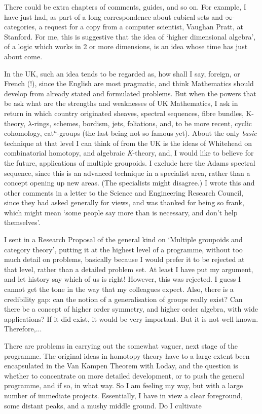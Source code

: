 \documentclass[11pt]{article}
\begin{document}
There could be extra chapters of comments, guides, and so on. For
example, I have just had, as part of a long correspondence about cubical
sets and $\infty$-categories, a request for a copy from a computer scientist,
Vaughan Pratt, at Stanford. For me, this is suggestive that the idea of
`higher dimensional algebra', of a logic which works in 2 or more
dimensions, is an idea whose time has just about come.

In the UK, such an idea tends to be regarded as, how shall I say,
foreign, or French (!), since the English are most pragmatic, and think
Mathematics should develop from already stated and formulated problems. But
when the powers that be ask what are the strengths and weaknesses of UK
Mathematics, I ask in return in which country originated sheaves, spectral
sequences, fibre bundles, K-theory, $\lambda$-rings, schemes, bordism, jets,
foliations, and, to be more recent, cyclic cohomology, cat$^{n}$-groups (the last
being not so famous yet). About the only \textit{basic} technique at that level I
can think of from the UK is the ideas of Whitehead on combinatorial
homotopy, and algebraic \textit{K}-theory, and, I would like to believe for the
future, applications of multiple groupoids. I exclude here the Adams
spectral sequence, since this is an advanced technique in a specialist area,
rather than a concept opening up new areas. (The specialists might
disagree.) I wrote this and other comments in a letter to the Science and
Engineering Research Council, since they had asked generally for views, and
was thanked for being so frank, which might mean `some people say more than
is necessary, and don't help themselves'.

I sent in a Research Proposal of the general kind on `Multiple
groupoids and category theory', putting it at the highest level of a
programme, without too much detail on problems, basically because I would
prefer it to be rejected at that level, rather than a detailed problem set.
At least I have put my argument, and let history say which of us is right!
However, this was rejected. I guess I cannot get the tone in the way that
my colleagues expect. Also, there is a credibility gap: can the notion of a
generalisation of groups really exist? Can there be a concept of higher
order symmetry, and higher order algebra, with wide applications? If it did
exist, it would be very important. But it is not well known. Therefore,...

There are problems in carrying out the somewhat vaguer, next stage of
the programme. The original ideas in homotopy theory have to a large extent
been encapsulated in the Van Kampen Theorem with Loday, and the question is
whether to concentrate on more detailed development, or to push the general
programme, and if so, in what way. So I am feeling my way, but with a large
number of immediate projects. Essentially, I have in view a clear
foreground, some distant peaks, and a mushy middle ground. Do I cultivate
\end{document}
